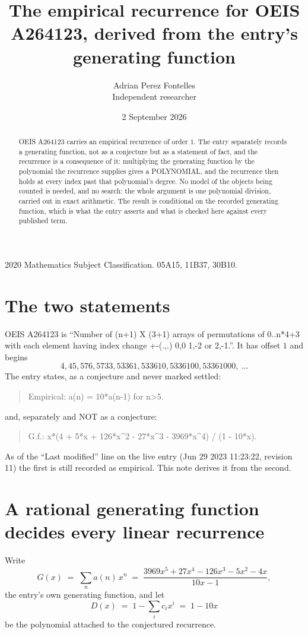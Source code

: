 \documentclass[11pt,a4paper]{article}
\title{The empirical recurrence for OEIS A264123, derived from the entry's generating function}
\author{Adrian Perez Fontelles\\ \small Independent researcher}
\date{2 September 2026}
\theoremstyle{plain}
\theoremstyle{definition}
\begin{document}
\maketitle

\begin{abstract}
OEIS A264123 carries an empirical recurrence of order $1$. The entry separately records a
generating function, not as a conjecture but as a statement of fact, and the recurrence is a
consequence of it: multiplying the generating function by the polynomial the recurrence
supplies gives a POLYNOMIAL, and the recurrence then holds at every index past that
polynomial's degree. No model of the objects being counted is needed, and no search: the
whole argument is one polynomial division, carried out in exact arithmetic. The result is
conditional on the recorded generating function, which is what the entry asserts and what is
checked here against every published term.
\end{abstract}

\noindent\small 2020 Mathematics Subject Classification. 05A15, 11B37, 30B10.\normalsize

\section{The two statements}

OEIS A264123 is ``Number of (n+1) X (3+1) arrays of permutations of 0..n*4+3 with each element having index change +-(.,.) 0,0 1,-2 or 2,-1.''. It has offset $1$ and begins
\[
4, 45, 576, 5733, 53361, 533610, 5336100, 53361000,\ \dots
\]
The entry states, as a conjecture and never marked settled:
\begin{quote}
Empirical: a(n) = 10*a(n-1) for n>5.
\end{quote}
and, separately and NOT as a conjecture:
\begin{quote}
G.f.: x*(4 + 5*x + 126*x\^{}2 - 27*x\^{}3 - 3969*x\^{}4) / (1 - 10*x).
\end{quote}
As of the ``Last modified'' line on the live entry (Jun 29 2023 11:23:22, revision 11) the first is still
recorded as empirical. This note derives it from the second.

\section{A rational generating function decides every linear recurrence}

Write
\[
G(x)\;=\;\sum_{n}a(n)\,x^{n}\;=\;\frac{3969 x^{5} + 27 x^{4} - 126 x^{3} - 5 x^{2} - 4 x}{10 x - 1},
\]
the entry's own generating function, and let
\[
D(x)\;=\;1-\sum_i c_i x^{i}\;=\;1 - 10 x
\]
be the polynomial attached to the conjectured recurrence.
\end{document}
